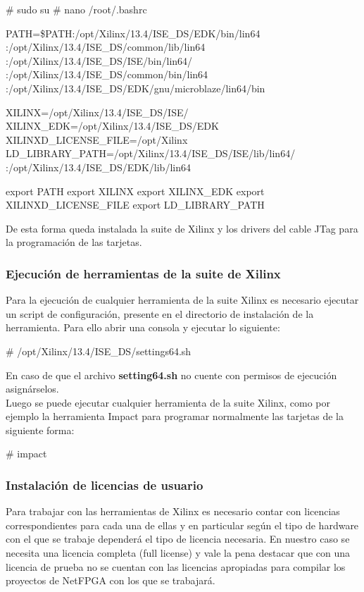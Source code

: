 \begin{bash}
# sudo su
# nano /root/.bashrc

PATH=\$PATH:/opt/Xilinx/13.4/ISE_DS/EDK/bin/lin64
:/opt/Xilinx/13.4/ISE_DS/common/lib/lin64
:/opt/Xilinx/13.4/ISE_DS/ISE/bin/lin64/
:/opt/Xilinx/13.4/ISE_DS/common/bin/lin64
:/opt/Xilinx/13.4/ISE_DS/EDK/gnu/microblaze/lin64/bin

XILINX=/opt/Xilinx/13.4/ISE_DS/ISE/
XILINX_EDK=/opt/Xilinx/13.4/ISE_DS/EDK
XILINXD_LICENSE_FILE=/opt/Xilinx
LD_LIBRARY_PATH=/opt/Xilinx/13.4/ISE_DS/ISE/lib/lin64/
:/opt/Xilinx/13.4/ISE_DS/EDK/lib/lin64

export PATH
export XILINX
export XILINX_EDK
export XILINXD_LICENSE_FILE
export LD_LIBRARY_PATH
\end{bash}

De esta forma queda instalada la suite de Xilinx y los drivers del cable JTag para la programación de las tarjetas.

\subsubsection{Ejecución de herramientas de la suite de Xilinx}
Para la ejecución de cualquier herramienta de la suite Xilinx es necesario ejecutar un script de configuración, presente en el directorio de instalación de la herramienta. Para ello abrir una consola y ejecutar lo siguiente:\\

\begin{bash}
# /opt/Xilinx/13.4/ISE_DS/settings64.sh
\end{bash}

En caso de que el archivo \textbf{setting64.sh} no cuente con permisos de ejecución asignárselos.\\ 

Luego se puede ejecutar cualquier herramienta de la suite Xilinx, como por ejemplo la herramienta Impact para programar normalmente las tarjetas de la siguiente forma:\\

\begin{bash}
# impact
\end{bash}

\subsubsection{Instalación de licencias de usuario}
Para trabajar con las herramientas de Xilinx es necesario contar con licencias correspondientes para cada una de ellas y en particular seg\'un el tipo de hardware con el que se trabaje dependerá el tipo de licencia necesaria. En nuestro caso se necesita una licencia completa (full license) y vale la pena destacar que con una licencia de prueba no se cuentan con las licencias apropiadas para compilar los proyectos de NetFPGA con los que se trabajar\'a.\\

